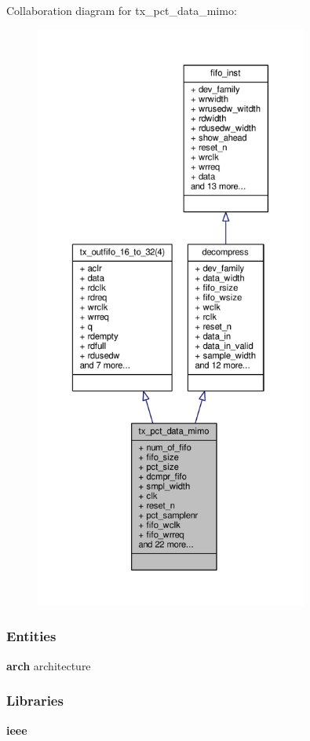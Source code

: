 Collaboration diagram for tx\+\_\+pct\+\_\+data\+\_\+mimo\+:\nopagebreak
\begin{figure}[H]
\begin{center}
\leavevmode
\includegraphics[height=550pt]{d5/d9f/classtx__pct__data__mimo__coll__graph}
\end{center}
\end{figure}
\subsubsection*{Entities}
\begin{DoxyCompactItemize}
\item 
{\bf arch} architecture
\end{DoxyCompactItemize}
\subsubsection*{Libraries}
 \begin{DoxyCompactItemize}
\item 
{\bf ieee} 
\end{DoxyCompactItemize}
